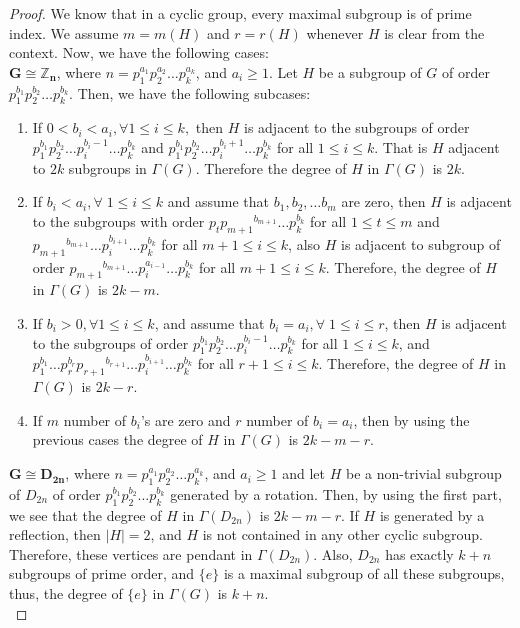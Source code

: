 \documentclass[11pt,twoside]{amsart}
\def \Z {{\mathbb{Z}}}
\def \Ga {{\Gamma }}
\begin{document}
   \begin{proof}
   We know that in a cyclic group, every maximal subgroup is of prime index. We assume $m=m(H)$ and $r=r(H)$ whenever $H$ is clear from the context.  Now, we have the following cases:\\
       $\mathbf{G\cong \Z_n}$, where $n=p_1^{a_1}p_2^{a_2}\dots p_k^{a_k}$, and $a_i\geq 1$. Let $H$ be a subgroup of $G$ of order $p_1^{b_1}p_2^{b_2}\dots p_k^{b_k}.$ Then, we have the following subcases:
        \begin{enumerate}[label={(\arabic*)}]
            \item If $0<b_i<a_i, \forall 1\leq i \leq k,$ then $H$ is adjacent to the subgroups of order $p_1^{b_1}p_2^{b_2}\dots p_i^{b_i-1}\dots p_k^{b_k}$ and $p_1^{b_1}p_2^{b_2}\dots p_i^{b_i+1}\dots p_k^{b_k}$ for all $1\leq i \leq k.$ That is $H$ adjacent to $2k$ subgroups in $\Gamma (G).$ Therefore the degree of $H$ in $\Gamma (G)$ is $2k.$

            
            \item If $b_i<a_i, \forall \;1\leq i \leq k$   and assume that $b_1, b_2,\ldots b_m$ are zero, then $H$ is adjacent to  the subgroups with order $p_t{p_{m+1}}^{b_{m+1}}\dots p_k^{b_k}$  
  for all $1\leq t\leq m$ and ${p_{m+1}}^{b_{m+1}}\dots p_i^{b_{i+1}}\dots p_k^{b_k}$ for all ${m+1}\leq i \leq k$, also $H$ is adjacent  to subgroup of order ${p_{m+1}}^{b_{m+1}}\dots p_i^{a_{i-1}}\dots p_k^{b_k}$ for all $m+1\leq i\leq k$. Therefore, the degree of $H$ in $\Gamma (G)$ is $2k-m.$

  
            \item If $b_i > 0, \forall 1\leq i\leq k$, and assume that $b_i=a_i,\forall \; 1\leq i \leq r$, then $H$ is adjacent to the subgroups of order  $p_1^{b_1}p_2^{b_2}\dots p_i^{b_i-1}\dots p_k^{b_k}$ for all $1\leq i\leq k$, and $p_1^{b_1}\dots p_r^{b_r}{p_{r+1}}^{b_{r+1}}\dots p_i^{b_{i+1}}\dots p_k^{b_k}$ for all $r+1\leq i\leq k$. Therefore, the degree of $H$ in $\Gamma (G)$ is $2k-r$.

            
            \item If $m$ number of $b_i$'s are zero and $r$ number of $b_i=a_i$, then by using the previous cases the degree of $H$ in $\Ga (G)$ is $2k-m-r$.
        \end{enumerate}
          $\mathbf{G\cong D_{2n}}$, where $n=p_1^{a_1}p_2^{a_2}\dots p_k^{a_k}$, and $a_i\geq 1$ and let $H$ be a non-trivial subgroup of $D_{2n}$ of order $p_1^{b_1}p_2^{b_2}\dots p_k^{b_k}$ generated by a rotation. Then, by using the first part, we see that the degree of $H$ in $\Gamma (D_{2n})$ is $2k-m-r.$  If $H$ is generated by a reflection, then $|H|=2$, and $H$ is not contained in any other cyclic subgroup. Therefore, these vertices are pendant in $\Ga(D_{2n}).$ Also, $D_{2n}$ has exactly $k+n$ subgroups of prime order, and $\{e\}$ is a maximal subgroup of all these subgroups, thus, the degree of $\{e\}$ in $\Gamma (G)$ is $k+n$.\\
          

\end{proof}
\end{document}
